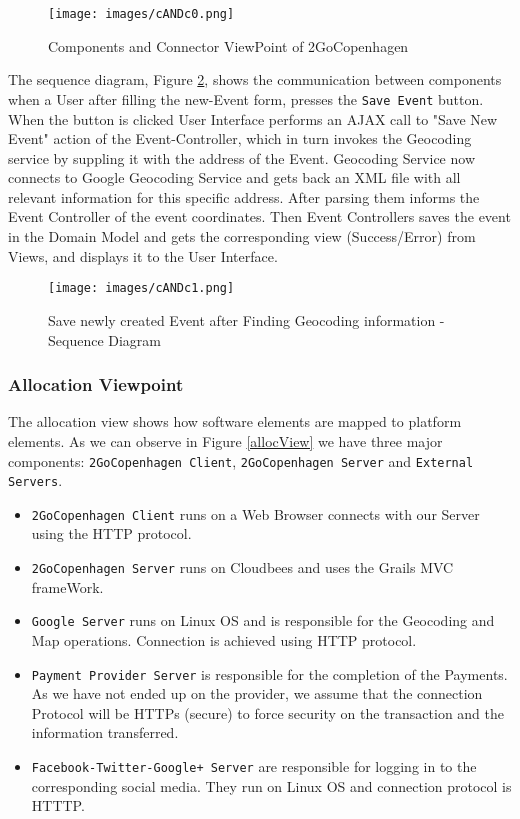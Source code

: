 \begin{figure}[H]
	\centering
	\texttt{[image: images/cANDc0.png]}
	\caption{Components and Connector ViewPoint of 2GoCopenhagen}
	\label{cc1}
\end{figure}

The sequence diagram, Figure \ref{cc2}, shows the communication between components when a User after filling the new-Event form, presses the \verb|Save Event| button. When the button is clicked User Interface performs an AJAX call to  "Save New Event" action of the Event-Controller, which in turn invokes the Geocoding service by suppling it with the address of the Event. Geocoding Service now connects to Google Geocoding Service and gets back an XML file with all relevant information for this specific address. After parsing them informs the Event Controller of the event coordinates. Then Event Controllers saves the event in the Domain Model and gets the corresponding view (Success/Error) from Views, and displays it to the User Interface.
 
\begin{figure}[H]
	\centering
	\texttt{[image: images/cANDc1.png]}
	\caption{Save newly created Event after Finding Geocoding information - Sequence Diagram}
	\label{cc2}
\end{figure}



\subsubsection{Allocation Viewpoint}

The allocation view shows how software elements are mapped to platform elements. 
As we can observe in Figure \ref{allocView} we have three major components: \verb|2GoCopenhagen Client|, \verb|2GoCopenhagen Server| and \verb|External Servers|.
\begin{itemize}
	\item \verb|2GoCopenhagen Client| runs on a Web Browser connects with our Server using the HTTP protocol.
	\item \verb|2GoCopenhagen Server| runs on Cloudbees and uses the Grails MVC frameWork.
	\item \verb|Google Server| runs on Linux OS and is responsible for the Geocoding and Map operations. Connection is achieved using HTTP protocol.
	\item \verb|Payment Provider Server| is responsible for the completion of the Payments. As we have not ended up on the provider, we assume that the connection Protocol will be HTTPs (secure) to force security on the transaction and the information transferred. 
	\item \verb|Facebook-Twitter-Google+ Server| are responsible for logging in to the corresponding social media. They run on Linux OS and connection protocol is HTTTP.
\end{itemize}

